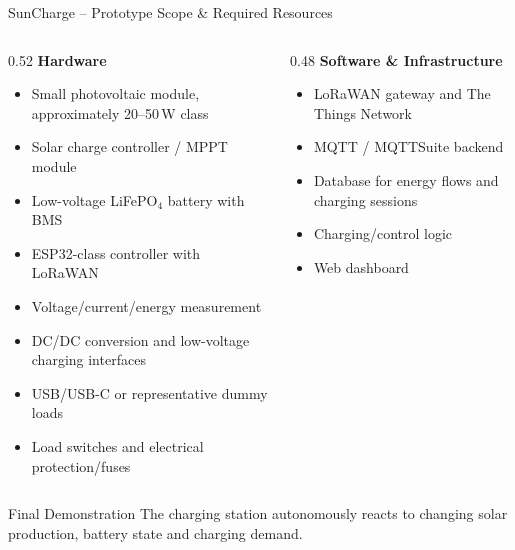 \begin{frame}{SunCharge -- Prototype Scope \& Required Resources}
\small
\begin{columns}[T,onlytextwidth]
    \begin{column}{0.52\textwidth}
        \textbf{Hardware}
        \begin{itemize}
            \item Small photovoltaic module, approximately 20--50\,W class
            \item Solar charge controller / MPPT module
            \item Low-voltage LiFePO$_4$ battery with BMS
            \item ESP32-class controller with LoRaWAN
            \item Voltage/current/energy measurement
            \item DC/DC conversion and low-voltage charging interfaces
            \item USB/USB-C or representative dummy loads
            \item Load switches and electrical protection/fuses
        \end{itemize}
    \end{column}
    \begin{column}{0.48\textwidth}
        \textbf{Software \& Infrastructure}
        \begin{itemize}
            \item LoRaWAN gateway and The Things Network
            \item MQTT / MQTTSuite backend
            \item Database for energy flows and charging sessions
            \item Charging/control logic
            \item Web dashboard
        \end{itemize}
    \end{column}
\end{columns}

\begin{block}{Final Demonstration}
The charging station autonomously reacts to changing solar production, battery state and charging demand.
\end{block}
\end{frame}
